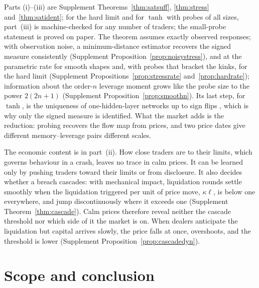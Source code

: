Parts (i)--(iii) are Supplement Theorems~\ref{thm:satsuff}, \ref{thm:stress} and~\ref{thm:satident}; for the hard limit and for $\tanh$ with probes of all sizes, part~(iii) is machine-checked for any number of traders; the small-probe statement is proved on paper. The theorem assumes exactly observed responses; with observation noise, a minimum-distance estimator recovers the signed measure consistently (Supplement Proposition~\ref{prop:noisystress}), and at the parametric rate for smooth shapes and, with probes that bracket the kinks, for the hard limit (Supplement Propositions~\ref{prop:stressrate} and~\ref{prop:hardrate}); information about the order-$n$ leverage moment grows like the probe size to the power $2(2n+1)$ (Supplement Proposition~\ref{prop:smoothn}). Its last step, for $\tanh$, is the uniqueness of one-hidden-layer networks up to sign flips \citep{sussmann1992}, which is why only the signed measure is identified. What the market adds is the reduction: probing recovers the flow map from prices, and two price dates give different memory--leverage pairs different scales.

The economic content is in part~(ii). How close traders are to their limits, which governs behaviour in a crash, leaves no trace in calm prices. It can be learned only by pushing traders toward their limits or from disclosure. It also decides whether a breach cascades: with mechanical impact, liquidation rounds settle smoothly when the liquidation triggered per unit of price move, $\kappa\ell$, is below one everywhere, and jump discontinuously where it exceeds one (Supplement Theorem~\ref{thm:cascade}). Calm prices therefore reveal neither the cascade threshold nor which side of it the market is on. When dealers anticipate the liquidation but capital arrives slowly, the price falls at once, overshoots, and the threshold is lower (Supplement Proposition~\ref{prop:cascadedyn}).

\section{Scope and conclusion}\label{n:concl}

